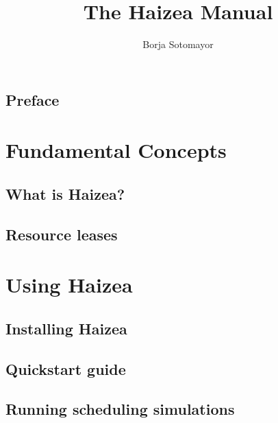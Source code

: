 \documentclass[11pt,oneside]{scrbook}
\begin{document}
\frontmatter
\title{The Haizea Manual}
\author{Borja Sotomayor}

\begin{latexonly}

\end{latexonly}
\begin{htmlonly}
\maketitle
\end{htmlonly}

\tableofcontents

\chapter{Preface}


\mainmatter

\part{Fundamental Concepts}

\chapter{What is Haizea?}
\label{chap:whatis}



\chapter{Resource leases}
\label{chap:leases}


\part{Using Haizea}

\chapter{Installing Haizea}
\label{chap:install}


\chapter{Quickstart guide}
\label{chap:quickstart}


\chapter{Running scheduling simulations}
\label{chap:simulation}

\end{document}
